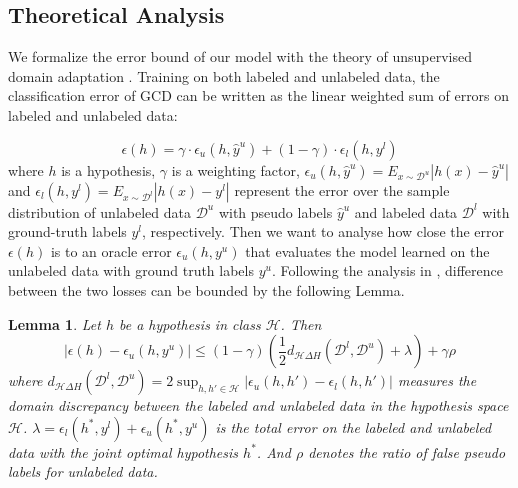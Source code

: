 \documentclass[letterpaper]{article} %
\newtheorem{lemma}{Lemma}
\begin{document}
\subsection{Theoretical Analysis}
We formalize the error bound of our model with the theory of unsupervised domain adaptation \citep{proto3,theory}. Training on both labeled and unlabeled data, the classification error of GCD can be written as the linear weighted sum of errors on labeled and unlabeled data:

\begin{equation}
\epsilon(h)=\gamma \cdot \epsilon_{u}(h,\hat y^u) + (1-\gamma) \cdot \epsilon_{l}(h,y^l)
\label{ErrorTPN}
\end{equation}
where $h$ is a hypothesis, $\gamma$ is a weighting factor, $\epsilon_{u}(h,\hat y^u)=E_{x\sim \mathcal{D}^u}|h(x)-\hat y^u|$ and $\epsilon_{l}(h,y^l)=E_{x\sim \mathcal{D}^l}|h(x)-y^l|$ represent the error over the sample distribution of unlabeled data $\mathcal{D}^u$ with pseudo labels $\hat y^u$ and labeled data $\mathcal{D}^l$ with ground-truth labels $y^l$, respectively.
Then we want to analyse how close the error $\epsilon(h)$ is to an oracle error $\epsilon_{u}(h,y^{u})$ that evaluates the model learned on the unlabeled data with ground truth labels $y^{u}$. Following the analysis in \citet{proto3}, difference between the two losses can be bounded by the following Lemma.


\begin{lemma} 
Let $h$ be a hypothesis in class $\mathcal{H}$. Then
\begin{equation}
\left|\epsilon(h)-\epsilon_{u}(h,y^u)\right| \le(1-\gamma) (\frac{1}{2}d_{\mathcal{H}\Delta{H}}(\mathcal{D}^l,\mathcal{D}^u)+\lambda)+\gamma\rho
\end{equation}
where $d_{\mathcal{H}\Delta{H}}(\mathcal{D}^l,\mathcal{D}^u)= 2 \sup_{h,h' \in\mathcal{H}} |\epsilon_u(h,h')-\epsilon_l(h,h')|$ measures the domain discrepancy between the labeled and unlabeled data in the hypothesis space $\mathcal{H}$. $\lambda=\epsilon_l(h^*,y^l)+\epsilon_{u}(h^*,y^{u})$ is the total error on the labeled and unlabeled data with the joint optimal hypothesis $h^*$. And $\rho$ denotes the ratio of false pseudo labels for unlabeled data.
\end{lemma}
\end{document}
